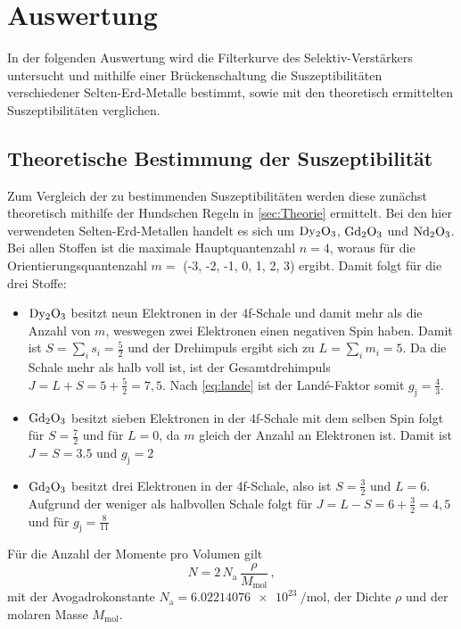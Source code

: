 \section{Auswertung}
\label{sec:Auswertung}

In der folgenden Auswertung wird die Filterkurve des Selektiv-Verstärkers untersucht
und mithilfe einer Brückenschaltung die Suszeptibilitäten verschiedener Selten-Erd-Metalle bestimmt,
sowie mit den theoretisch ermittelten Suszeptibilitäten verglichen.


\subsection{Theoretische Bestimmung der Suszeptibilität}

Zum Vergleich der zu bestimmenden Suszeptibilitäten werden diese zunächst theoretisch mithilfe der Hundschen Regeln in \autoref{sec:Theorie} ermittelt.
Bei den hier verwendeten Selten-Erd-Metallen handelt es sich um $\ce{Dy2O3}$, $\ce{Gd2O3}$ und $\ce{Nd2O3}$.
Bei allen Stoffen ist die maximale Hauptquantenzahl $n = 4$, woraus für die Orientierungsquantenzahl $m =$ (-3, -2, -1, 0, 1, 2, 3) ergibt. 
Damit folgt für die drei Stoffe:

\begin{itemize}
  \item $\ce{Dy2O3}$ besitzt neun Elektronen in der 4f-Schale und damit mehr als die Anzahl von $m$, weswegen zwei Elektronen einen negativen Spin haben.
        Damit ist $ S = \sum_{i} s_i = \frac{5}{2}$ und der Drehimpuls ergibt sich zu $L = \sum_i m_i = 5$.
        Da die Schale mehr als halb voll ist, ist der Gesamtdrehimpuls $J = L + S = 5 + \frac{5}{2} = 7,5$.
        Nach \autoref{eq:lande} ist der Landé-Faktor somit $g_\text{j} = \frac{4}{3}$.

  \item $\ce{Gd2O3}$ besitzt sieben Elektronen in der 4f-Schale mit dem selben Spin folgt für $S = \frac{7}{2}$ und für $L = 0$, da $m$ gleich der Anzahl an Elektronen ist.
        Damit ist $J = S = 3.5$ und $g_\text{j} = 2$

  \item $\ce{Gd2O3}$ besitzt drei Elektronen in der 4f-Schale, also ist $S = \frac{3}{2}$ und $L = 6$.
        Aufgrund der weniger als halbvollen Schale folgt für $J = L - S = 6 + \frac{3}{2} = 4,5$ und für $g_\text{j} = \frac{8}{11}$
\end{itemize}

Für die Anzahl der Momente pro Volumen gilt
\begin{equation}
  N = 2 \, N_\text{a} \, \frac{\rho}{M_\text{mol}} \, ,
\end{equation}
mit der Avogadrokonstante $N_\text{a} = \qty{6.02214076e23}{\per\mol}$, der Dichte $\rho$ und der molaren Masse $M_\text{mol}$.

